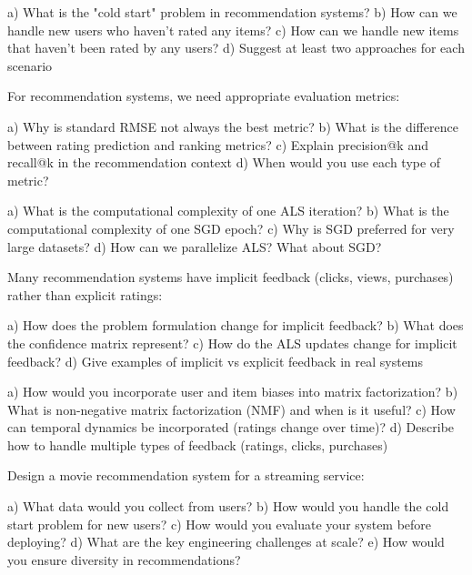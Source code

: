 \documentclass{article}
\begin{document}
\begin{problembox}[title=Cold Start Problem]

a) What is the "cold start" problem in recommendation systems?
b) How can we handle new users who haven't rated any items?
c) How can we handle new items that haven't been rated by any users?
d) Suggest at least two approaches for each scenario
\end{problembox}

\begin{problembox}[title=Evaluation Metrics]

For recommendation systems, we need appropriate evaluation metrics:

a) Why is standard RMSE not always the best metric?
b) What is the difference between rating prediction and ranking metrics?
c) Explain precision@k and recall@k in the recommendation context
d) When would you use each type of metric?
\end{problembox}

\begin{problembox}[title=Scalability Considerations]

a) What is the computational complexity of one ALS iteration?
b) What is the computational complexity of one SGD epoch?
c) Why is SGD preferred for very large datasets?
d) How can we parallelize ALS? What about SGD?
\end{problembox}

\begin{problembox}[title=Implicit Feedback]

Many recommendation systems have implicit feedback (clicks, views, purchases) rather than explicit ratings:

a) How does the problem formulation change for implicit feedback?
b) What does the confidence matrix represent?
c) How do the ALS updates change for implicit feedback?
d) Give examples of implicit vs explicit feedback in real systems
\end{problembox}

\begin{problembox}[title=Advanced Extensions]

a) How would you incorporate user and item biases into matrix factorization?
b) What is non-negative matrix factorization (NMF) and when is it useful?
c) How can temporal dynamics be incorporated (ratings change over time)?
d) Describe how to handle multiple types of feedback (ratings, clicks, purchases)
\end{problembox}

\begin{problembox}[title=Real-world Implementation]

Design a movie recommendation system for a streaming service:

a) What data would you collect from users?
b) How would you handle the cold start problem for new users?
c) How would you evaluate your system before deploying?
d) What are the key engineering challenges at scale?
e) How would you ensure diversity in recommendations?
\end{problembox}
\end{document}
